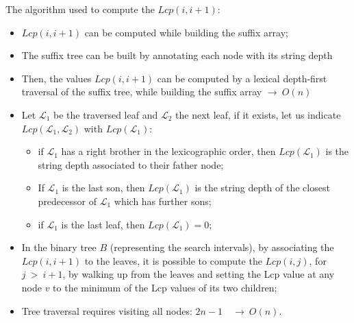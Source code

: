 The algorithm used to compute the $Lcp(i, i+1)$:
\begin{itemize}
	\item $Lcp(i, i+1)$ can be computed while building the suffix array;
	\item The suffix tree can be built by annotating each node with its string depth 
	\item Then, the values $Lcp(i, i+1)$ can be computed by a lexical depth-first traversal of the suffix tree, while building the suffix array $ \rightarrow ~ O(n)$
	\item Let $\mathcal{L}_1$ be the traversed leaf and $\mathcal{L}_2$ the next leaf, if it exists, let us indicate $Lcp(\mathcal{L}_1,\mathcal{L}_2)$ with $Lcp(\mathcal{L}_1)$:
	\begin{itemize}
	\item if $\mathcal{L}_1$ has a right brother in the lexicographic order, then $Lcp(\mathcal{L}_1)$ is the string depth associated to their father node;
	\item If $\mathcal{L}_1$ is the last son, then $Lcp(\mathcal{L}_1)$ is the string depth of the closest predecessor of $\mathcal{L}_1$ which has further sons;
	\item if $\mathcal{L}_1$ is the last leaf, then $Lcp(\mathcal{L}_1) = 0$;
	\end{itemize}

	\item In the binary tree $B$ (representing the search intervals), by associating the $Lcp(i,i+1)$ to the leaves, it is possible to compute the $Lcp(i,j)$, for $j~>~i+1$, by walking up from the leaves and setting the Lcp value at any node $v$ to the minimum of the Lcp values of its two children;
	\item Tree traversal requires visiting all nodes: $2n-1\quad \rightarrow ~ O(n)$.
\end{itemize}